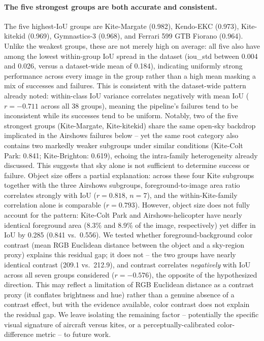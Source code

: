 \paragraph{The five strongest groups are both accurate and consistent.} The five highest-IoU groups are Kite-Margate (0.982), Kendo-EKC (0.973), Kite-kitekid (0.969), Gymnastics-3 (0.968), and Ferrari 599 GTB Fiorano (0.964). Unlike the weakest groups, these are not merely high on average: all five also have among the lowest within-group IoU spread in the dataset (iou\_std between 0.004 and 0.026, versus a dataset-wide mean of 0.184), indicating uniformly strong performance across every image in the group rather than a high mean masking a mix of successes and failures. This is consistent with the dataset-wide pattern already noted: within-class IoU variance correlates negatively with mean IoU ($r=-0.711$ across all 38 groups), meaning the pipeline's failures tend to be inconsistent while its successes tend to be uniform. Notably, two of the five strongest groups (Kite-Margate, Kite-kitekid) share the same open-sky backdrop implicated in the Airshows failures below -- yet the same root category also contains two markedly weaker subgroups under similar conditions (Kite-Colt Park: 0.841; Kite-Brighton: 0.619), echoing the intra-family heterogeneity already discussed. This suggests that sky alone is not sufficient to determine success or failure. Object size offers a partial explanation: across these four Kite subgroups together with the three Airshows subgroups, foreground-to-image area ratio correlates strongly with IoU ($r=0.818$, $n=7$), and the within-Kite-family correlation alone is comparable ($r=0.793$). However, object size does not fully account for the pattern: Kite-Colt Park and Airshows-helicopter have nearly identical foreground area (8.3\% and 8.9\% of the image, respectively) yet differ in IoU by 0.285 (0.841 vs.\ 0.556). We tested whether foreground-background color contrast (mean RGB Euclidean distance between the object and a sky-region proxy) explains this residual gap; it does not -- the two groups have nearly identical contrast (209.1 vs.\ 212.9), and contrast correlates \emph{negatively} with IoU across all seven groups considered ($r=-0.576$), the opposite of the hypothesized direction. This may reflect a limitation of RGB Euclidean distance as a contrast proxy (it conflates brightness and hue) rather than a genuine absence of a contrast effect, but with the evidence available, color contrast does not explain the residual gap. We leave isolating the remaining factor -- potentially the specific visual signature of aircraft versus kites, or a perceptually-calibrated color-difference metric -- to future work.

